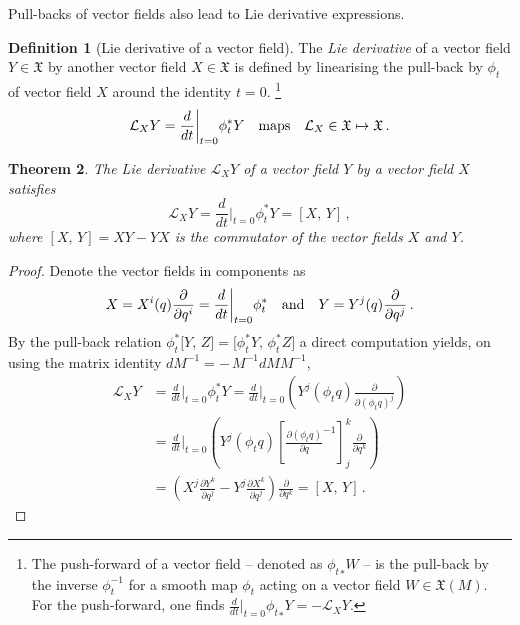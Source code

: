 \documentclass[11pt, oneside]{article}   	%
\numberwithin{equation}{section}
\theoremstyle{plain}
\newtheorem{theorem}{Theorem}[section]
\theoremstyle{definition}
\newtheorem{definition}[theorem]{Definition}
\theoremstyle{remark}
\newcommand{\<}{\langle}
\renewcommand{\>}{\rangle}
\begin{document}
Pull-backs of vector fields also lead to Lie derivative expressions.  
\begin{definition}[Lie derivative of a vector field]
The \emph{Lie derivative} of a vector field $Y\in\mathfrak{X}$ by another vector field $X\in\mathfrak{X}$ is defined 
by linearising the pull-back by $\phi_t$ of vector field $X$ around the identity $t=0$.%
\footnote{The push-forward of a vector field -- denoted as ${\phi_t}_*W$ -- is the pull-back by the inverse $\phi_t^{-1}$ 
for a smooth map $\phi_t$ acting on a vector field $W\in \mathfrak{X}(M)$. For the push-forward, one finds $ \frac{d}{dt}\big|_{t=0}{\phi_t}_*Y= -  \mathcal{L}_XY$.}
\begin{eqnarray*}
 \mathcal{L}_XY = \frac{d}{dt}\bigg|_{t=0}\phi^*_tY
\quad\hbox{maps}\quad
 \mathcal{L}_X\in\mathfrak{X} \mapsto  \mathfrak{X}
\,.
\end{eqnarray*}
\end{definition}
\begin{theorem}
The Lie derivative $ \mathcal{L}_XY$ of a vector field $Y$ by a vector field $X$ satisfies
\begin{equation}
 \mathcal{L}_XY = \frac{d}{dt}\bigg|_{t=0}\phi^*_tY
= [X,\,Y]
\,,
\label{LieBrkt}
\end{equation}
where $[X,\,Y]=XY-YX$ is the commutator of the vector fields $X$ and $Y$.
\end{theorem}

\begin{proof}
Denote the vector fields in components as
\begin{eqnarray*}
X = X^i(q)\frac{\partial}{ \partial q^i} = \frac{d}{dt}\bigg|_{t=0}\phi^*_t
\quad\hbox{and}\quad
Y = Y^j(q)\frac{\partial}{ \partial q^j}
\,.
\end{eqnarray*}
By the pull-back relation $\phi_t^*\big[Y,\,Z\big] = \big[\phi_t^*Y,\,\phi_t^*Z\big]$ a direct computation yields, on using the matrix identity $dM^{-1}=-\,M^{-1}dM M^{-1}$,
\begin{align*}
 \mathcal{L}_XY 
&= \frac{d}{dt}\bigg|_{t=0}\phi^*_tY
= \frac{d}{dt}\bigg|_{t=0} \left(Y^j(\phi_tq)\frac{\partial}{ \partial (\phi_tq)^j}\right)
\\
&= \frac{d}{dt}\bigg|_{t=0} \left(Y^j(\phi_tq)
\left[\frac{ \partial (\phi_tq)}{\partial q}^{-1}\right]^k_j
\frac{\partial}{ \partial q^k}\right)
\\
&= 
\left(
X^j \frac{ \partial Y^k}{\partial q^j}
-
Y^j \frac{ \partial X^k}{\partial q^j}
\right)\frac{\partial}{ \partial q^k}
= 
[X,\,Y]
\,.
\end{align*}
\end{proof}
\end{document}
